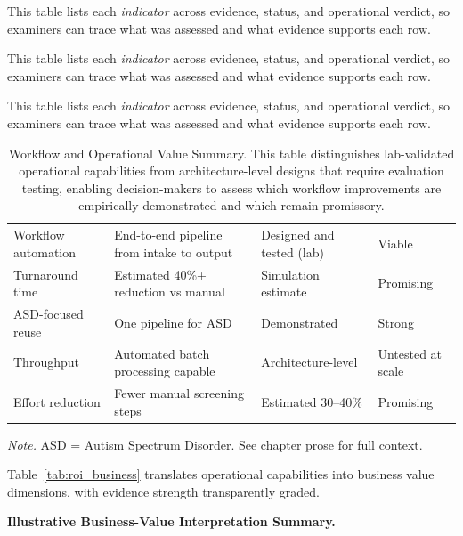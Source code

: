 \noindent This table lists each \textit{indicator} across evidence, status, and operational verdict, so examiners can trace what was assessed and what evidence supports each row.



\noindent This table lists each \textit{indicator} across evidence, status, and operational verdict, so examiners can trace what was assessed and what evidence supports each row.


\noindent This table lists each \textit{indicator} across evidence, status, and operational verdict, so examiners can trace what was assessed and what evidence supports each row.



{\tablestripes\tablefontsize
{}
\begin{xltabular}{\textwidth}{@{} l L l l @{}}
\caption[Workflow and Operational Value Summary]{Workflow and Operational Value Summary. This table distinguishes lab-validated operational capabilities from architecture-level designs that require evaluation testing, enabling decision-makers to assess which workflow improvements are empirically demonstrated and which remain promissory.}\label{tab:workflow_value} \\
\toprule
{} &  &  &  \\
\midrule
\endfirsthead
\endhead
\bottomrule
\endlastfoot
Workflow automation & End-to-end pipeline from intake to output & Designed and tested (lab) & Viable \\
Turnaround time & Estimated 40\%+ reduction vs manual & Simulation estimate & Promising \\
ASD-focused reuse & One pipeline for ASD & Demonstrated & Strong \\
Throughput & Automated batch processing capable & Architecture-level & Untested at scale \\
Effort reduction & Fewer manual screening steps & Estimated 30--40\% & Promising \\
\end{xltabular}}
\vspace{0.3em}\noindent\textit{Note.} ASD = Autism Spectrum Disorder. See chapter prose for full context.

Table~\ref{tab:roi_business} translates operational capabilities into business value dimensions, with evidence strength transparently graded.

\noindent\textbf{Illustrative Business-Value Interpretation Summary.}
\label{para:business_value_interpretation}

